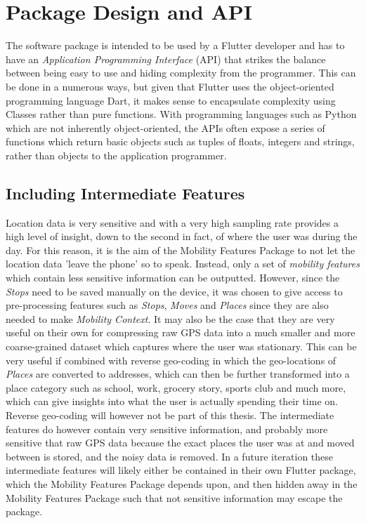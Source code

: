 \section{Package Design and API}
The software package is intended to be used by a Flutter developer and has to have an \textit{Application Programming Interface} (API) that strikes the balance between being easy to use and hiding complexity from the programmer. This can be done in a numerous ways, but given that Flutter uses the object-oriented programming language Dart, it makes sense to encapsulate complexity using Classes rather than pure functions. With programming languages such as Python which are not inherently object-oriented, the APIs often expose a series of functions which return basic objects such as tuples of floats, integers and strings, rather than objects to the application programmer.

\subsection{Including Intermediate Features}
Location data is very sensitive and with a very high sampling rate provides a high level of insight, down to the second in fact, of where the user was during the day. For this reason, it is the aim of the Mobility Features Package to not let the location data 'leave the phone' so to speak. Instead, only a set of \textit{mobility features} which contain less sensitive information can be outputted. However, since the \textit{Stops} need to be saved manually on the device, it was chosen to give access to pre-processing features such as \textit{Stops}, \textit{Moves} and \textit{Places} since they are also needed to make \textit{Mobility Context}. It may also be the case that they are very useful on their own for compressing raw GPS data into a much smaller and more coarse-grained dataset which captures where the user was stationary. This can be very useful if combined with reverse geo-coding in which the geo-locations of \textit{Places} are converted to addresses, which can then be further transformed into a place category such as school, work, grocery story, sports club and much more, which can give insights into what the user is actually spending their time on. Reverse geo-coding will however not be part of this thesis. The intermediate features do however contain very sensitive information, and probably more sensitive that raw GPS data because the exact places the user was at and moved between is stored, and the noisy data is removed. In a future iteration these intermediate features will likely either be contained in their own Flutter package, which the Mobility Features Package depends upon, and then hidden away in the Mobility Features Package such that not sensitive information may escape the package.


